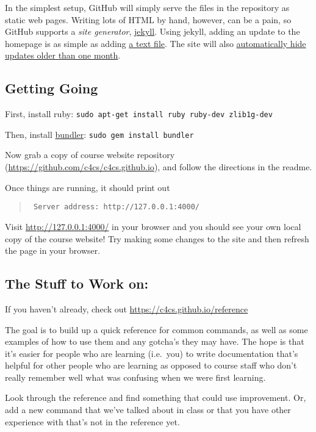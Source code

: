 \documentclass{article}
\begin{document}
In the simplest setup, GitHub will simply serve the files in the repository as
static web pages. Writing lots of HTML by hand, however, can be a pain, so
GitHub supports a \emph{site generator}, \href{https://jekyllrb.com/}{jekyll}.
Using jekyll, adding an update to the homepage is as simple as adding
\href{https://github.com/c4cs/c4cs.github.io/blob/master/_updates/f16/2016-10-11-chaos.md}{a text file}.
The site will also
\href{https://github.com/c4cs/c4cs.github.io/blob/master/index.html#L32}%
{automatically hide updates older than one month}.

\subsection*{Getting Going}

First, install ruby: \texttt{sudo apt-get install ruby ruby-dev zlib1g-dev}

Then, install \href{http://bundler.io}{bundler}: \texttt{sudo gem install bundler}

Now grab a copy of course website repository
(\url{https://github.com/c4cs/c4cs.github.io}), and follow the directions
in the readme.

Once things are running, it should print out
\begin{quote}\tt
  Server address: http://127.0.0.1:4000/
\end{quote}

Visit \url{http://127.0.0.1:4000/} in your browser and you should see your own
local copy of the course website! Try making some changes to the site and then
refresh the page in your browser.

\subsection*{The Stuff to Work on:}

If you haven't already, check out \url{https://c4cs.github.io/reference}

The goal is to build up a quick reference for common commands, as well as some
examples of how to use them and any gotcha's they may have. The hope is that
it's easier for people who are learning (i.e.\ you) to write documentation
that's helpful for other people who are learning as opposed to course staff
who don't really remember well what was confusing when we were first learning.

Look through the reference and find something that could use improvement. Or,
add a new command that we've talked about in class or that you have other
experience with that's not in the reference yet.
\end{document}
